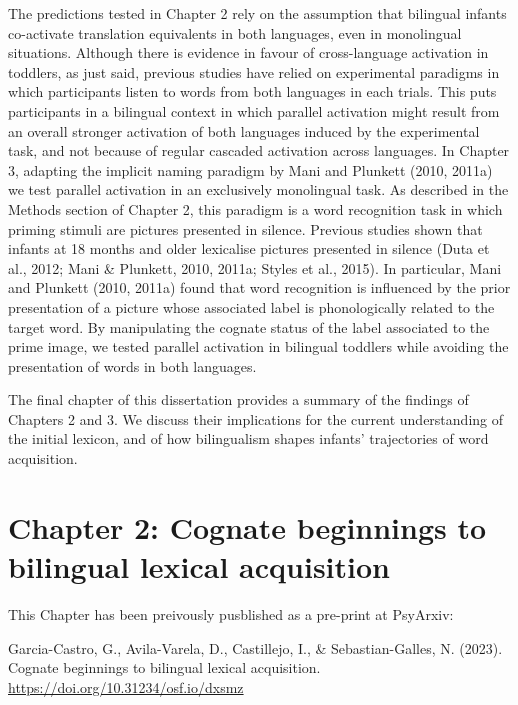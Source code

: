\documentclass[
  12pt,
  b5paperpaper,
  twoside]{scrreprt}
\begin{document}
The predictions tested in Chapter 2 rely on the assumption that
bilingual infants co-activate translation equivalents in both languages,
even in monolingual situations. Although there is evidence in favour of
cross-language activation in toddlers, as just said, previous studies
have relied on experimental paradigms in which participants listen to
words from both languages in each trials. This puts participants in a
bilingual context in which parallel activation might result from an
overall stronger activation of both languages induced by the
experimental task, and not because of regular cascaded activation across
languages. In Chapter 3, adapting the implicit naming paradigm by Mani
and Plunkett (2010, 2011a) we test parallel activation in an exclusively
monolingual task. As described in the Methods section of Chapter 2, this
paradigm is a word recognition task in which priming stimuli are
pictures presented in silence. Previous studies shown that infants at 18
months and older lexicalise pictures presented in silence (Duta et al.,
2012; Mani \& Plunkett, 2010, 2011a; Styles et al., 2015). In
particular, Mani and Plunkett (2010, 2011a) found that word recognition
is influenced by the prior presentation of a picture whose associated
label is phonologically related to the target word. By manipulating the
cognate status of the label associated to the prime image, we tested
parallel activation in bilingual toddlers while avoiding the
presentation of words in both languages.

The final chapter of this dissertation provides a summary of the
findings of Chapters 2 and 3. We discuss their implications for the
current understanding of the initial lexicon, and of how bilingualism
shapes infants' trajectories of word acquisition.


\hypertarget{chapter-2-cognate-beginnings-to-bilingual-lexical-acquisition}{%
\chapter{Chapter 2: Cognate beginnings to bilingual lexical
acquisition}\label{chapter-2-cognate-beginnings-to-bilingual-lexical-acquisition}}

\begin{tcolorbox}[enhanced jigsaw, opacitybacktitle=0.6, bottomrule=.15mm, arc=.35mm, title=\textcolor{quarto-callout-note-color}{\faInfo}\hspace{0.5em}{Note}, toprule=.15mm, bottomtitle=1mm, rightrule=.15mm, colbacktitle=quarto-callout-note-color!10!white, toptitle=1mm, opacityback=0, leftrule=.75mm, coltitle=black, left=2mm, colframe=quarto-callout-note-color-frame, titlerule=0mm, colback=white, breakable]

This Chapter has been preivously pusblished as a pre-print at PsyArxiv:

Garcia-Castro, G., Avila-Varela, D., Castillejo, I., \&
Sebastian-Galles, N. (2023). Cognate beginnings to bilingual lexical
acquisition. \url{https://doi.org/10.31234/osf.io/dxsmz}

\end{tcolorbox}
\end{document}
